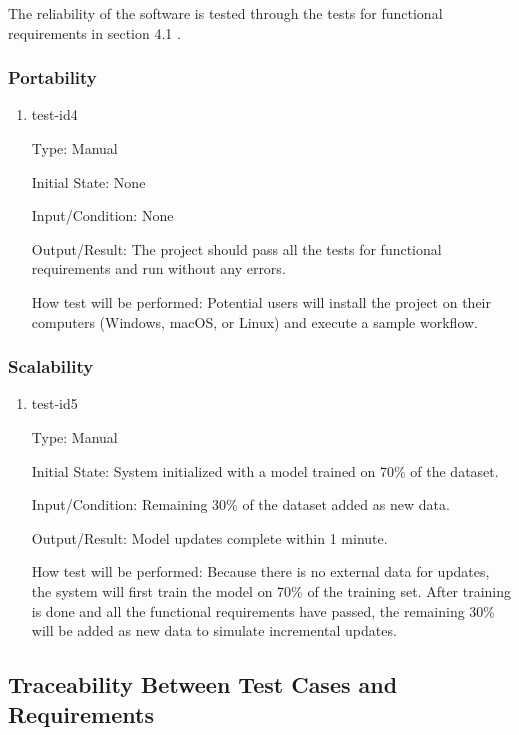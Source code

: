 \documentclass[12pt, titlepage]{article}
\begin{document}
The reliability of the software is tested through the tests for
functional requirements in section 4.1 .

\subsubsection{Portability}

\begin{enumerate}

\item{test-id4\\}

Type: Manual
					
Initial State: None
					
Input/Condition: None
					
Output/Result: The project should pass all the tests for functional requirements and run without any errors.

How test will be performed: Potential users will install the project on their computers (Windows, macOS, or Linux) and execute a sample workflow. 
\end{enumerate}


\subsubsection{Scalability}

\begin{enumerate}

\item{test-id5\\}

Type: Manual

Initial State: System initialized with a model trained on 70\% of the dataset.

Input/Condition: Remaining 30\% of the dataset added as new data.

Output/Result: Model updates complete within 1 minute.

How test will be performed: Because there is no external data for updates, the system will first train the model on 70\% of the training set. After training is done and all the functional requirements have passed, the remaining 30\% will be added as new data to simulate incremental updates.


\end{enumerate}

\subsection{Traceability Between Test Cases and Requirements}
\end{document}
